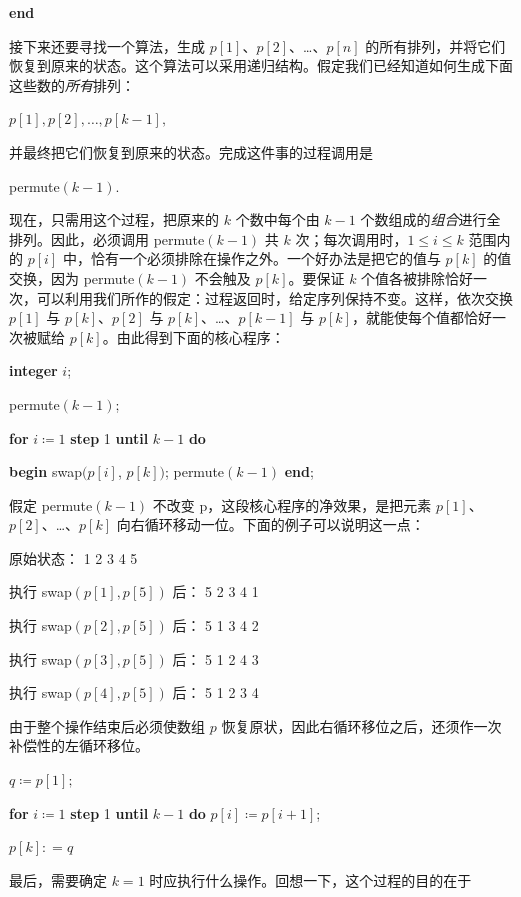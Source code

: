 \documentclass[twoside,11pt,fontset=none]{ctexbook}
\begin{document}
\quad \quad \textbf{end}

接下来还要寻找一个算法，生成 $p[1]$、$p[2]$、\dots、$p[n]$ 的所有排列，并将它们恢复到原来的状态。这个算法可以采用递归结构。假定我们已经知道如何生成下面这些数的\textit{所有}排列：

\quad $p[1], p[2], \dots, p[k - 1],$

\noindent
并最终把它们恢复到原来的状态。完成这件事的过程调用是

\quad permute$(k - 1)$.

\noindent
现在，只需用这个过程，把原来的 $k$ 个数中每个由 $k - 1$ 个数组成的\textit{组合}进行全排列。因此，必须调用 permute$(k - 1)$ 共 $k$ 次；每次调用时，$1 \leqslant i \leqslant k$ 范围内的 $p[i]$ 中，恰有一个必须排除在操作之外。一个好办法是把它的值与 $p[k]$ 的值交换，因为 permute$(k - 1)$ 不会触及 $p[k]$。要保证 $k$ 个值各被排除恰好一次，可以利用我们所作的假定：过程返回时，给定序列保持不变。这样，依次交换 $p[1]$ 与 $p[k]$、$p[2]$ 与 $p[k]$、\dots、$p[k - 1]$ 与 $p[k]$，就能使每个值都恰好一次被赋给 $p[k]$。由此得到下面的核心程序：

\quad \textbf{integer} $i$;

\quad permute$(k - 1)$;

\quad \textbf{for} $i\coloneq 1$ \textbf{step} 1 \textbf{until} $k - 1$ \textbf{do}

\quad \quad \textbf{begin} swap$(p[i]$, $p[k])$; permute$(k - 1)$ \textbf{end};

\noindent
假定 permute$(k - 1)$ 不改变 p，这段核心程序的净效果，是把元素 $p[1]$、$p[2]$、\dots、$p[k]$ 向右循环移动一位。下面的例子可以说明这一点：

\quad 原始状态：\tabto*{12em}  1 2 3 4 5

\quad 执行 swap$(p[1], p[5])$ 后：\tabto*{12em} 5 2 3 4 1

\quad 执行 swap$(p[2], p[5])$ 后：\tabto*{12em}  5 1 3 4 2

\quad 执行 swap$(p[3], p[5])$ 后：\tabto*{12em}  5 1 2 4 3

\quad 执行 swap$(p[4], p[5])$ 后：\tabto*{12em}  5 1 2 3 4

\noindent
由于整个操作结束后必须使数组 $p$ 恢复原状，因此右循环移位之后，还须作一次补偿性的左循环移位。

\quad $q\coloneq p[1];$

\quad \textbf{for} $i\coloneq 1$ \textbf{step} 1 \textbf{until} $k - 1$ \textbf{do} $p[i]\coloneq p[i + 1]$;

\quad $p[k]: = q$

\noindent
最后，需要确定 $k = 1$ 时应执行什么操作。回想一下，这个过程的目的在于
\end{document}
